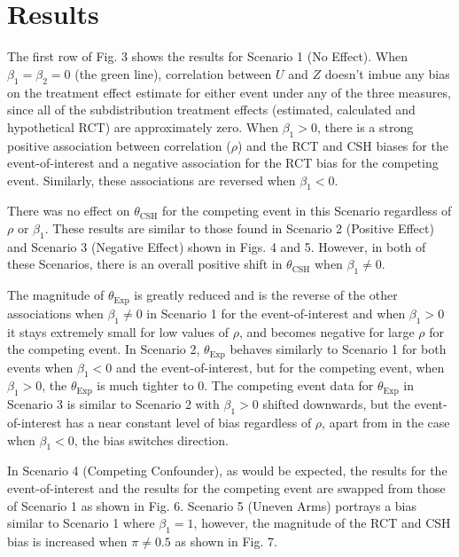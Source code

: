 \documentclass[12pt,PhD,twoside,openright]{muthesis}
\begin{document}
\hypertarget{results-1}{%
\section{Results}\label{results-1}}

The first row of Fig. 3 shows the results for Scenario 1 (No Effect). When \(\beta_1=\beta_2=0\) (the green line), correlation between \(U\) and \(Z\) doesn't imbue any bias on the treatment effect estimate for either event under any of the three measures, since all of the subdistribution treatment effects (estimated, calculated and hypothetical RCT) are approximately zero. When \(\beta_1>0\), there is a strong positive association between correlation (\(\rho\)) and the RCT and CSH biases for the event-of-interest and a negative association for the RCT bias for the competing event. Similarly, these associations are reversed when \(\beta_1<0\).

There was no effect on \(\theta_{\textrm{CSH}}\) for the competing event in this Scenario regardless of \(\rho\) or \(\beta_1\). These results are similar to those found in Scenario 2 (Positive Effect) and Scenario 3 (Negative Effect) shown in Figs. 4 and 5. However, in both of these Scenarios, there is an overall positive shift in \(\theta_{\textrm{CSH}}\) when \(\beta_1\neq0\).

The magnitude of \(\theta_{\textrm{Exp}}\) is greatly reduced and is the reverse of the other associations when \(\beta_1\neq0\) in Scenario 1 for the event-of-interest and when \(\beta_1>0\) it stays extremely small for low values of \(\rho\), and becomes negative for large \(\rho\) for the competing event. In Scenario 2, \(\theta_{\textrm{Exp}}\) behaves similarly to Scenario 1 for both events when \(\beta_1<0\) and the event-of-interest, but for the competing event, when \(\beta_1>0\), the \(\theta_{\textrm{Exp}}\) is much tighter to 0. The competing event data for \(\theta_{\textrm{Exp}}\) in Scenario 3 is similar to Scenario 2 with \(\beta_1>0\) shifted downwards, but the event-of-interest has a near constant level of bias regardless of \(\rho\), apart from in the case when \(\beta_1<0\), the bias switches direction.

In Scenario 4 (Competing Confounder), as would be expected, the results for the event-of-interest and the results for the competing event are swapped from those of Scenario 1 as shown in Fig. 6. Scenario 5 (Uneven Arms) portrays a bias similar to Scenario 1 where \(\beta_1=1\), however, the magnitude of the RCT and CSH bias is increased when \(\pi\neq0.5\) as shown in Fig. 7.
\end{document}
